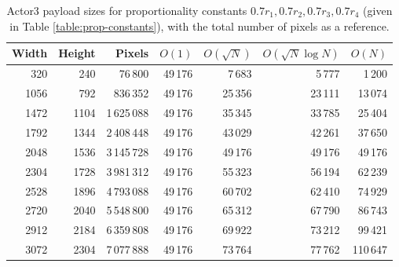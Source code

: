 \documentclass[11pt,a4paper,twoside,openright]{report}
\begin{document}
\begin{appendices}
\begin{table}[htbp]
\begin{center}
\begin{tabular}{ | r r | r | r r r r | }
\hline
Width & Height & Pixels & $O(1)$ & $O(\sqrt{N})$ & $O(\sqrt{N} \log N)$ & $O(N)$ \\ \hline
320 & 240 & 76\,800 & 49\,176 & 7\,683 & 5\,777 & 1\,200 \\
1056 & 792 & 836\,352 & 49\,176 & 25\,356 & 23\,111 & 13\,074 \\
1472 & 1104 & 1\,625\,088 & 49\,176 & 35\,345 & 33\,785 & 25\,404 \\
1792 & 1344 & 2\,408\,448 & 49\,176 & 43\,029 & 42\,261 & 37\,650 \\
2048 & 1536 & 3\,145\,728 & 49\,176 & 49\,176 & 49\,176 & 49\,176 \\
2304 & 1728 & 3\,981\,312 & 49\,176 & 55\,323 & 56\,194 & 62\,239 \\
2528 & 1896 & 4\,793\,088 & 49\,176 & 60\,702 & 62\,410 & 74\,929 \\
2720 & 2040 & 5\,548\,800 & 49\,176 & 65\,312 & 67\,790 & 86\,743 \\
2912 & 2184 & 6\,359\,808 & 49\,176 & 69\,922 & 73\,212 & 99\,421 \\
3072 & 2304 & 7\,077\,888 & 49\,176 & 73\,764 & 77\,762 & 110\,647 \\ \hline
\end{tabular}
\caption{Actor3 payload sizes for proportionality constants $0.7 r_1, 0.7 r_2, 0.7 r_3, 0.7 r_4$ (given in Table \ref{table:prop-constants}), with the total number of pixels as a reference.}
\end{center}
\end{table}


\end{appendices}
\end{document}
